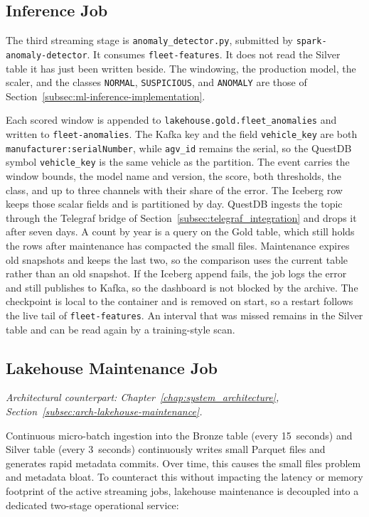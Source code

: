 \subsection{Inference Job}
\label{subsec:gold-inference-job}

The third streaming stage is \texttt{anomaly\_detector.py}, submitted by \texttt{spark-anomaly-detector}. It consumes \texttt{fleet-features}. It does not read the Silver table it has just been written beside. The windowing, the production model, the scaler, and the classes \texttt{NORMAL}, \texttt{SUSPICIOUS}, and \texttt{ANOMALY} are those of Section~\ref{subsec:ml-inference-implementation}.

Each scored window is appended to \texttt{lakehouse.gold.fleet\_anomalies} and written to \texttt{fleet-anomalies}. The Kafka key and the field \texttt{vehicle\_key} are both \texttt{manufacturer:serialNumber}, while \texttt{agv\_id} remains the serial, so the QuestDB symbol \texttt{vehicle\_key} is the same vehicle as the partition. The event carries the window bounds, the model name and version, the score, both thresholds, the class, and up to three channels with their share of the error. The Iceberg row keeps those scalar fields and is partitioned by day. QuestDB ingests the topic through the Telegraf bridge of Section~\ref{subsec:telegraf_integration} and drops it after seven days. A count by year is a query on the Gold table, which still holds the rows after maintenance has compacted the small files. Maintenance expires old snapshots and keeps the last two, so the comparison uses the current table rather than an old snapshot. If the Iceberg append fails, the job logs the error and still publishes to Kafka, so the dashboard is not blocked by the archive. The checkpoint is local to the container and is removed on start, so a restart follows the live tail of \texttt{fleet-features}. An interval that was missed remains in the Silver table and can be read again by a training-style scan.

\subsection{Lakehouse Maintenance Job}
\label{subsec:lakehouse-maintenance-job}
\textit{Architectural counterpart: Chapter~\ref{chap:system_architecture}, Section~\ref{subsec:arch-lakehouse-maintenance}.}

Continuous micro-batch ingestion into the Bronze table (every 15~seconds) and Silver table (every 3~seconds) continuously writes small Parquet files and generates rapid metadata commits. Over time, this causes the small files problem and metadata bloat. To counteract this without impacting the latency or memory footprint of the active streaming jobs, lakehouse maintenance is decoupled into a dedicated two-stage operational service:

